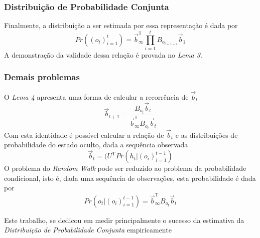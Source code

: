 \documentclass{subfiles}
\begin{document}
\subsubsection{Distribuição de Probabilidade Conjunta}

Finalmente, a distribuição a ser estimada por essa representação é dada por
\[
    Pr((o_i)_{i=1}^t) = \vec{b}_{\infty}^{\mathbb T} \prod_{i=1}^{t} B_{o_{t+1-i}} \vec{b}_1
\]
A demonstração da validade dessa relação é provada no \textit{Lema 3}.

\subsubsection{Demais problemas}

O \textit{Lema 4} apresenta uma forma de calcular a recorrência de $\vec{b}_t$
\[
    \vec{b}_{t+1} = \frac{B_{o_t} \vec{b}_t}{\vec{b}_{\infty}^{\mathbb T} B_{o_t} \vec{b}_t}
\]
Com esta identidade é possível calcular a relação de $\vec{b}_{t}$ e as distribuições de probabilidade do estado oculto, dada a sequência observada
\[
    \vec{b}_{t} = (U^{\mathrm T} Pr(h_t \vert (o_i)_{i=1}^{t-1})
\]
O problema do \textit{Random Walk} pode ser reduzido ao problema da probabilidade condicional, isto é, dada uma sequência de observações, esta probabilidade é dada por
\[
    Pr(o_t \vert (o_i)_{i=1}^{t-1}) = \vec{b}_{\infty}^{\mathrm T} B_{o_t} \vec{b}_t
\]

Este trabalho, se dedicou em medir principalmente o sucesso da estimativa da \textit{Distribuição de Probabilidade Conjunta} empiricamente
\end{document}
